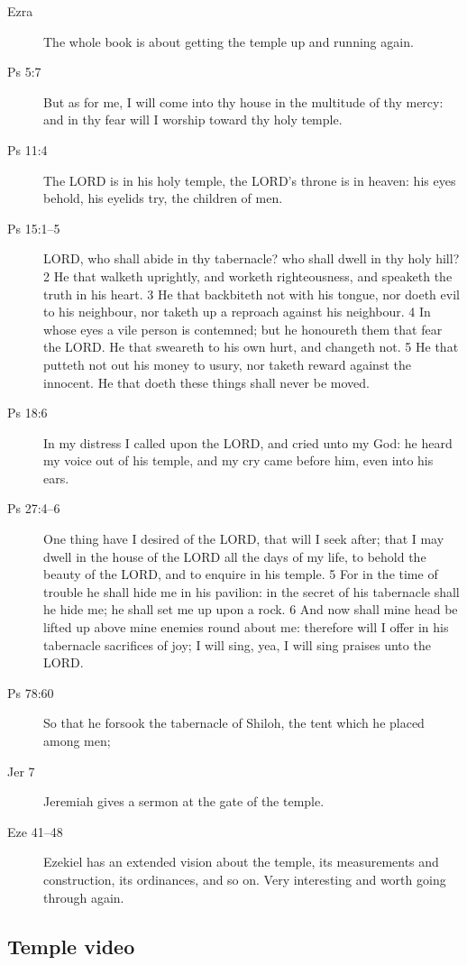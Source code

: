\begin{description}
		\item[Ezra] The whole book is about getting the temple up and running again.
		\item[Ps 5:7] But as for me, I will come into thy house in the multitude of thy mercy: and in thy fear will I worship toward thy holy temple.
		\item[Ps 11:4] The LORD is in his holy temple, the LORD's throne is in heaven: his eyes behold, his eyelids try, the children of men.
		\item[Ps 15:1--5] LORD, who shall abide in thy tabernacle? who shall dwell in thy holy hill? 2 He that walketh uprightly, and worketh righteousness, and speaketh the truth in his heart. 3 He that backbiteth not with his tongue, nor doeth evil to his neighbour, nor taketh up a reproach against his neighbour. 4 In whose eyes a vile person is contemned; but he honoureth them that fear the LORD. He that sweareth to his own hurt, and changeth not. 5 He that putteth not out his money to usury, nor taketh reward against the innocent. He that doeth these things shall never be moved.
		\item[Ps 18:6] In my distress I called upon the LORD, and cried unto my God: he heard my voice out of his temple, and my cry came before him, even into his ears.
		\item[Ps 27:4--6] One thing have I desired of the LORD, that will I seek after; that I may dwell in the house of the LORD all the days of my life, to behold the beauty of the LORD, and to enquire in his temple. 5 For in the time of trouble he shall hide me in his pavilion: in the secret of his tabernacle shall he hide me; he shall set me up upon a rock. 6 And now shall mine head be lifted up above mine enemies round about me: therefore will I offer in his tabernacle sacrifices of joy; I will sing, yea, I will sing praises unto the LORD.
		\item[Ps 78:60] So that he forsook the tabernacle of Shiloh, the tent which he placed among men;
		\item[Jer 7] Jeremiah gives a sermon at the gate of the temple.
		\item[Eze 41--48] Ezekiel has an extended vision about the temple, its measurements and construction, its ordinances, and so on. Very interesting and worth going through again.
		\end{description}
		
	\subsection{Temple video} %
	
